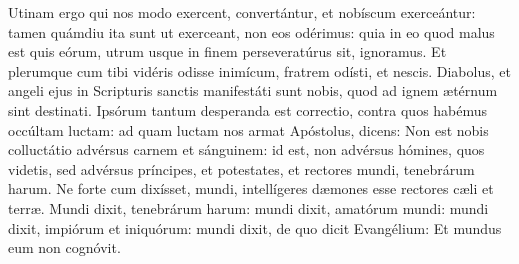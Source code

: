 
Utinam ergo qui nos modo exercent, convertántur, et nobíscum exerceántur: tamen quámdiu ita sunt ut exerceant, non eos odérimus: quia in eo quod malus est quis eórum, utrum usque in finem perseveratúrus sit, ignoramus. Et plerumque cum tibi vidéris odisse inimícum, fratrem odísti, et nescis. Diabolus, et angeli ejus in Scripturis sanctis manifestáti sunt nobis, quod ad ignem ætérnum sint destinati. Ipsórum tantum desperanda est correctio, contra quos habémus occúltam luctam: ad quam luctam nos armat Apóstolus, dicens: Non est nobis colluctátio advérsus carnem et sánguinem: id est, non advérsus hómines, quos videtis, sed advérsus príncipes, et potestates, et rectores mundi, tenebrárum harum. Ne forte cum dixísset, mundi, intellígeres dæmones esse rectores cæli et terræ. Mundi dixit, tenebrárum harum: mundi dixit, amatórum mundi: mundi dixit, impiórum et iniquórum: mundi dixit, de quo dicit Evangélium: Et mundus eum non cognóvit.
\par